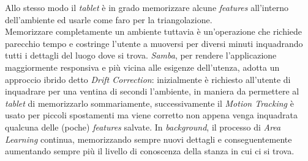 Allo stesso modo il \emph{tablet} è in grado memorizzare alcune \emph{features} all'interno dell'ambiente ed usarle come faro per la triangolazione. \\
Memorizzare completamente un ambiente tuttavia è un'operazione che richiede parecchio tempo e costringe l'utente a muoversi per diversi minuti inquadrando tutti i dettagli del luogo dove si trova. \emph{Samba}, per rendere l'applicazione maggiormente responsiva e più vicina alle esigenze dell'utenza, adotta un approccio ibrido detto \emph{Drift Correction}: inizialmente è richiesto all'utente di inquadrare per una ventina di secondi l'ambiente, in maniera da permettere al \emph{tablet} di memorizzarlo sommariamente, successivamente il \emph{Motion Tracking} è usato per piccoli spostamenti ma viene corretto non appena venga inquadrata qualcuna delle (poche) \emph{features} salvate. In \emph{background}, il processo di \emph{Area Learning} continua, memorizzando sempre nuovi dettagli e conseguentemente aumentando sempre più il livello di conoscenza della stanza in cui ci si trova.\\

